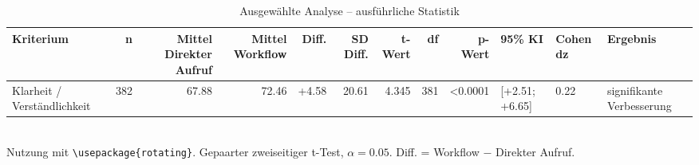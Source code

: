 \begin{table}
\centering
\caption{Ausgewählte Analyse -- ausführliche Statistik}
\begin{tabular}{lrrrrrrrrlll}
\toprule
Kriterium & n & Mittel Direkter Aufruf & Mittel Workflow & Diff. & SD Diff. & t-Wert & df & p-Wert & 95\% KI & Cohen dz & Ergebnis \\
\midrule
Klarheit / Verständlichkeit & 382 & 67.88 & 72.46 & +4.58 & 20.61 & 4.345 & 381 & <0.0001 & [+2.51; +6.65] & 0.22 & signifikante Verbesserung \\
\bottomrule
\end{tabular}
\\[2mm]
\footnotesize Nutzung mit \texttt{\textbackslash usepackage\{rotating\}}. Gepaarter zweiseitiger t-Test, $\alpha=0.05$. Diff. = Workflow $-$ Direkter Aufruf.
\end{table}
